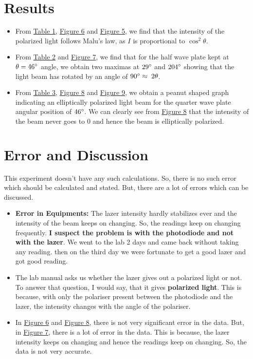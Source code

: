 \section{Results}
\begin{itemize}
	\item From \hyperref[tab:malus_law]{Table 1}, \hyperref[fig:6]{Figure 6} and \hyperref[fig:5]{Figure 5}, we find that the intensity of the polarized light follows Malu's law, as $I$ is proportional to $\cos^2{\theta}$.
	\item From \hyperref[tab:half]{Table 2} and \hyperref[fig:7]{Figure 7}, we find that for the half wave plate kept at $\theta=46\degree$ angle, we obtain two maximas at $29\degree$ and $204\degree$ showing that the light beam has rotated by an angle of $90\degree \approx \;2\theta$.
	\item From \hyperref[tab:quarter]{Table 3}, \hyperref[fig:8]{Figure 8} and \hyperref[fig:9]{Figure 9}, we obtain a peanut shaped graph indicating an elliptically polarized light beam for the quarter wave plate angular position of $46\degree$. We can clearly see from \hyperref[fig:8]{Figure 8} that the intensity of the beam never goes to 0 and hence the beam is elliptically polarized.
\end{itemize}


\section{Error and Discussion}

This experiment doesn't have any such calculations. So, there is no such error which should be calculated and stated. But, there are a lot of errors which can be discussed.

\begin{itemize}
	\item \textbf{Error in Equipments:} The lazer intensity hardly stabilizes ever and the intensity of the beam keeps on changing. So, the readings keep on changing frequently. \textbf{I suspect the problem is with the photodiode and not with the lazer}. We went to the lab 2 days and came back without taking any reading. then on the third day we were fortunate to get a good lazer and got good reading.
	\item The lab manual asks us whether the lazer gives out a polarized light or not. To answer that question, I would say, that it gives \textbf{polarized light}. This is because, with only the polariser present between the photodiode and the lazer, the intensity changes with the angle of the polariser.
	\item In \hyperref[fig:6]{Figure 6} and \hyperref[fig:8]{Figure 8}, there is not very significant error in the data. But, in \hyperref[fig:7]{Figure 7}, there is a lot of error in the data. This is because, the lazer intensity keeps on changing and hence the readings keep on changing. So, the data is not very accurate.
\end{itemize}